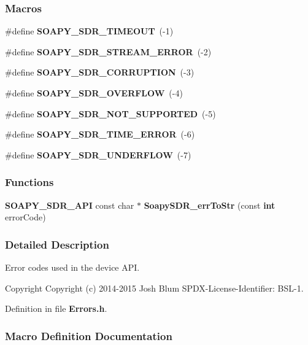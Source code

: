 \subsubsection*{Macros}
\begin{DoxyCompactItemize}
\item 
\#define {\bf S\+O\+A\+P\+Y\+\_\+\+S\+D\+R\+\_\+\+T\+I\+M\+E\+O\+UT}~(-\/1)
\item 
\#define {\bf S\+O\+A\+P\+Y\+\_\+\+S\+D\+R\+\_\+\+S\+T\+R\+E\+A\+M\+\_\+\+E\+R\+R\+OR}~(-\/2)
\item 
\#define {\bf S\+O\+A\+P\+Y\+\_\+\+S\+D\+R\+\_\+\+C\+O\+R\+R\+U\+P\+T\+I\+ON}~(-\/3)
\item 
\#define {\bf S\+O\+A\+P\+Y\+\_\+\+S\+D\+R\+\_\+\+O\+V\+E\+R\+F\+L\+OW}~(-\/4)
\item 
\#define {\bf S\+O\+A\+P\+Y\+\_\+\+S\+D\+R\+\_\+\+N\+O\+T\+\_\+\+S\+U\+P\+P\+O\+R\+T\+ED}~(-\/5)
\item 
\#define {\bf S\+O\+A\+P\+Y\+\_\+\+S\+D\+R\+\_\+\+T\+I\+M\+E\+\_\+\+E\+R\+R\+OR}~(-\/6)
\item 
\#define {\bf S\+O\+A\+P\+Y\+\_\+\+S\+D\+R\+\_\+\+U\+N\+D\+E\+R\+F\+L\+OW}~(-\/7)
\end{DoxyCompactItemize}
\subsubsection*{Functions}
\begin{DoxyCompactItemize}
\item 
{\bf S\+O\+A\+P\+Y\+\_\+\+S\+D\+R\+\_\+\+A\+PI} const char $\ast$ {\bf Soapy\+S\+D\+R\+\_\+err\+To\+Str} (const {\bf int} error\+Code)
\end{DoxyCompactItemize}


\subsubsection{Detailed Description}
Error codes used in the device A\+PI. 

\begin{DoxyCopyright}{Copyright}
Copyright (c) 2014-\/2015 Josh Blum S\+P\+D\+X-\/\+License-\/\+Identifier\+: B\+S\+L-\/1. 
\end{DoxyCopyright}


Definition in file {\bf Errors.\+h}.



\subsubsection{Macro Definition Documentation}
